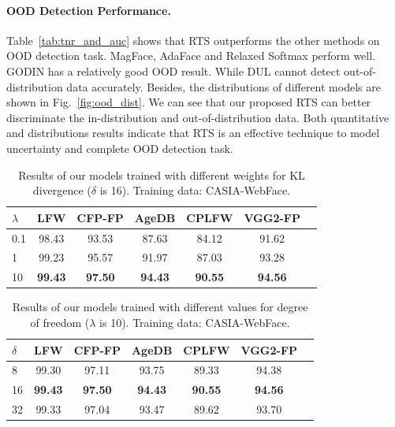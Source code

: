 \documentclass[letterpaper]{article} %
\begin{document}
\paragraph{OOD Detection Performance.}
Table~\ref{tab:tnr_and_auc} shows that RTS outperforms the other methods on OOD detection task. MagFace, AdaFace and Relaxed Softmax perform well. GODIN has a relatively good OOD result. While DUL cannot detect out-of-distribution data accurately. Besides, the distributions of different models are shown in Fig.~\ref{fig:ood_dist}. We can see that our proposed RTS can better discriminate the in-distribution and out-of-distribution data. Both quantitative and distributions results indicate that RTS is an effective technique to model uncertainty and complete OOD detection task.












\begin{table}
\centering
\begin{tabular}{|l|c|c|c|c|c|c|}
\hline
$\lambda$ & LFW & CFP-FP & AgeDB & CPLFW & VGG2-FP \\
\hline\hline
0.1 & 98.43 & 93.53 & 87.63 & 84.12 & 91.62 \\
1 & 99.23 & 95.57 & 91.97 & 87.03 & 93.28 \\
10 & \textbf{99.43} & \textbf{97.50} & \textbf{94.43} & \textbf{90.55} & \textbf{94.56} \\
\hline
\end{tabular}
\caption{Results of our models trained with different weights for KL divergence ($\delta$ is 16). Training data: CASIA-WebFace.}
\label{tab:kl_weight}
\end{table}


\begin{table}
\begin{center}
\begin{tabular}{|l|c|c|c|c|c|c|}
\hline
$\delta$ & LFW & CFP-FP & AgeDB & CPLFW & VGG2-FP \\
\hline\hline
8 & 99.30 & 97.11 & 93.75 & 89.33 & 94.38 \\
16 & \textbf{99.43} & \textbf{97.50} & \textbf{94.43} & \textbf{90.55} & \textbf{94.56} \\
32 & 99.33 & 97.04 & 93.47 & 89.62 & 93.70 \\
\hline
\end{tabular}
\end{center}
\vspace{-3.21mm}
\caption{Results of our models trained with different values for degree of freedom ($\lambda$ is 10). Training data: CASIA-WebFace.}
\label{tab:degree_of_freedom}
\end{table}
\end{document}

